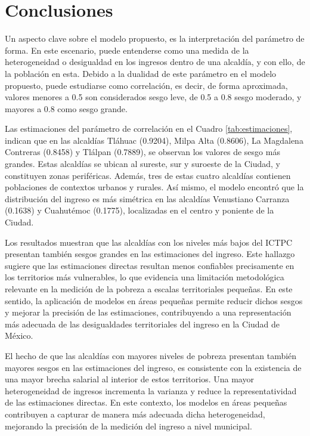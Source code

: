 \documentclass[11pt]{article}
\begin{document}
\section{Conclusiones}
\label{sec:conclusiones}


Un aspecto clave sobre el modelo propuesto, es la interpretación del parámetro de forma. En este escenario, puede entenderse como una medida de la heterogeneidad o desigualdad en los ingresos dentro de una alcaldía, y con ello, de la población en esta. Debido a la dualidad de este parámetro en el modelo propuesto, puede estudiarse como correlación, es decir, de forma aproximada, valores menores a 0.5 son considerados sesgo leve, de 0.5 a 0.8 sesgo moderado, y mayores a 0.8 como sesgo grande.

Las estimaciones del parámetro de correlación en el Cuadro \ref{tab:estimaciones}, indican que en las alcaldías Tláhuac (0.9204), Milpa Alta (0.8606), La Magdalena Contreras (0.8458) y Tlálpan (0.7889), se observan los valores de sesgo más grandes. Estas alcaldías se ubican al sureste, sur y suroeste de la Ciudad, y constituyen zonas periféricas. Además, tres de estas cuatro alcaldías contienen poblaciones de contextos urbanos y rurales. Así mismo, el modelo encontró que la distribución del ingreso es más simétrica en las alcaldías Venustiano Carranza (0.1638) y Cuahutémoc (0.1775), localizadas en el centro y poniente de la Ciudad.



Los resultados muestran que las alcaldías con los niveles más bajos del ICTPC presentan también sesgos grandes en las estimaciones del ingreso. Este hallazgo sugiere que las estimaciones directas resultan menos confiables precisamente en los territorios más vulnerables, lo que evidencia una limitación metodológica relevante en la medición de la pobreza a escalas territoriales pequeñas. En este sentido, la aplicación de modelos en áreas pequeñas permite reducir dichos sesgos y mejorar la precisión de las estimaciones, contribuyendo a una representación más adecuada de las desigualdades territoriales del ingreso en la Ciudad de México.

El hecho de que las alcaldías con mayores niveles de pobreza presentan también mayores sesgos en las estimaciones del ingreso, es consistente con la existencia de una mayor brecha salarial al interior de estos territorios. Una mayor heterogeneidad de ingresos incrementa la varianza y reduce la representatividad de las estimaciones directas.
En este contexto, los modelos en áreas pequeñas contribuyen a capturar de manera más adecuada dicha heterogeneidad, mejorando la precisión de la medición del ingreso a nivel municipal.
\end{document}
